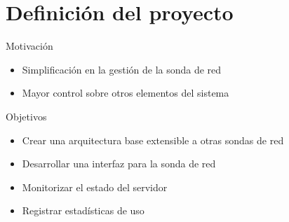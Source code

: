 \section{Definición del proyecto}

\begin{frame}{Motivación}
  \begin{itemize}[<alert@+>]
    \item Simplificación en la gestión de la sonda de red
    \item Mayor control sobre otros elementos del sistema
  \end{itemize}
\end{frame}

\begin{frame}{Objetivos}
  \begin{itemize}[<alert@+>]
    \item Crear una arquitectura base extensible a otras sondas de red
    \item Desarrollar una interfaz para la sonda de red
    \item Monitorizar el estado del servidor
    \item Registrar estadísticas de uso
  \end{itemize}
\end{frame}

